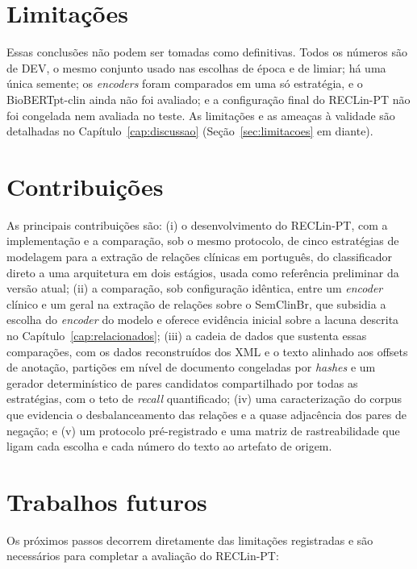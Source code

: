 \section{Limitações}

Essas conclusões não podem ser tomadas como definitivas. Todos os números são de DEV,
o mesmo conjunto usado nas escolhas de época e de limiar; há uma única semente; os
\emph{encoders} foram comparados em uma só estratégia, e o BioBERTpt-clin ainda não
foi avaliado; e a configuração final do RECLin-PT não foi congelada nem avaliada no
teste. As limitações e as ameaças à validade são detalhadas no
Capítulo~\ref{cap:discussao} (Seção~\ref{sec:limitacoes} em diante).

\section{Contribuições}

As principais contribuições são: (i) o desenvolvimento do RECLin-PT, com a
implementação e a comparação, sob o mesmo protocolo, de cinco estratégias de modelagem
para a extração de relações clínicas em português, do classificador direto a uma
arquitetura em dois estágios, usada como referência preliminar da versão atual; (ii) a
comparação, sob configuração idêntica, entre um \emph{encoder} clínico e um geral na
extração de relações sobre o SemClinBr, que subsidia a escolha do \emph{encoder} do
modelo e oferece evidência inicial sobre a lacuna descrita no
Capítulo~\ref{cap:relacionados}; (iii) a cadeia de dados que sustenta essas
comparações, com os dados reconstruídos dos XML e o texto alinhado aos offsets de
anotação, partições em nível de documento congeladas por \emph{hashes} e um gerador
determinístico de pares candidatos compartilhado por todas as estratégias, com o teto
de \emph{recall} quantificado; (iv) uma caracterização do corpus que evidencia o
desbalanceamento das relações e a quase adjacência dos pares de negação; e (v) um
protocolo pré-registrado e uma matriz de rastreabilidade que ligam cada escolha e cada
número do texto ao artefato de origem.

\section{Trabalhos futuros}

Os próximos passos decorrem diretamente das limitações registradas e são necessários
para completar a avaliação do RECLin-PT:

